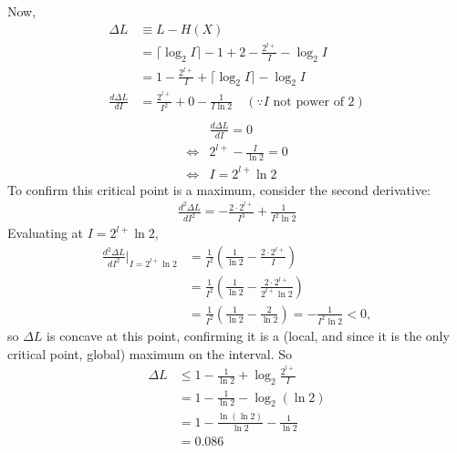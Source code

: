 \documentclass[12pt, a4paper]{article}
\begin{document}
\begin{sol}
Now, 
\begin{align*}
    \Delta L &\equiv L - H(X) \\
    &= \lceil \log_2 I \rceil - 1 + 2 - \frac{2^{l+}}{I} - \log_2 I\\
    &= 1 - \frac{2^{l+}}{I} + \lceil \log_2 I \rceil - \log_2 I \\
    \frac{d\Delta L}{dI} &= \frac{2^{l+}}{I^2} + 0 - \frac{1}{I \ln 2} \quad (\because I \text{ not power of 2})\\
\end{align*}
\begin{align*}
    &\frac{d\Delta L}{dI} = 0 \\
    \iff&2^{l+} - \frac{I}{\ln 2} = 0 \\
    \iff&I = 2^{l+}\ln 2
\end{align*}
To confirm this critical point is a maximum, consider the second derivative:
\begin{align*}
    \frac{d^2 \Delta L}{dI^2} = -\frac{2 \cdot 2^{l+}}{I^3} + \frac{1}{I^2 \ln 2}
\end{align*}
Evaluating at $I = 2^{l+}\ln 2$,
\begin{align*}
    \frac{d^2 \Delta L}{dI^2}\bigg|_{I = 2^{l+}\ln 2} &= \frac{1}{I^2}\left(\frac{1}{\ln 2} - \frac{2 \cdot 2^{l+}}{I}\right) \\
    &= \frac{1}{I^2}\left(\frac{1}{\ln 2} - \frac{2 \cdot 2^{l+}}{2^{l+}\ln 2}\right) \\
    &= \frac{1}{I^2}\left(\frac{1}{\ln 2} - \frac{2}{\ln 2}\right) = -\frac{1}{I^2 \ln 2} < 0,
\end{align*}
so $\Delta L$ is concave at this point, confirming it is a (local, and since it is the only critical point, global) maximum on the interval. So
\begin{align*}
    \Delta L &\leq 1 - \frac{1}{\ln 2} + \log_2 \frac{2^{l+}}{I} \\
    &= 1 - \frac{1}{\ln 2} - \log_2(\ln 2) \\
    &= 1 - \frac{\ln(\ln 2)}{\ln 2} - \frac{1}{\ln 2} \\
    &= 0.086
\end{align*}

\end{sol}
\bigskip
\end{document}
